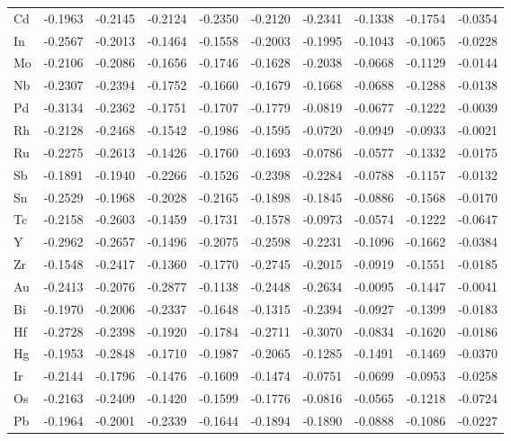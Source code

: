 \begin{table}[htbp]
{\begin{tabular}{l *{9}{l}}
        Cd & -0.1963 & -0.2145 & -0.2124 & -0.2350 & -0.2120 & -0.2341 & -0.1338 & -0.1754 & -0.0354 \\
        In & -0.2567 & -0.2013 & -0.1464 & -0.1558 & -0.2003 & -0.1995 & -0.1043 & -0.1065 & -0.0228 \\
        Mo & -0.2106 & -0.2086 & -0.1656 & -0.1746 & -0.1628 & -0.2038 & -0.0668 & -0.1129 & -0.0144 \\
        Nb & -0.2307 & -0.2394 & -0.1752 & -0.1660 & -0.1679 & -0.1668 & -0.0688 & -0.1288 & -0.0138 \\
        Pd & -0.3134 & -0.2362 & -0.1751 & -0.1707 & -0.1779 & -0.0819 & -0.0677 & -0.1222 & -0.0039 \\
        Rh & -0.2128 & -0.2468 & -0.1542 & -0.1986 & -0.1595 & -0.0720 & -0.0949 & -0.0933 & -0.0021 \\
        Ru & -0.2275 & -0.2613 & -0.1426 & -0.1760 & -0.1693 & -0.0786 & -0.0577 & -0.1332 & -0.0175 \\
        Sb & -0.1891 & -0.1940 & -0.2266 & -0.1526 & -0.2398 & -0.2284 & -0.0788 & -0.1157 & -0.0132 \\
        Sn & -0.2529 & -0.1968 & -0.2028 & -0.2165 & -0.1898 & -0.1845 & -0.0886 & -0.1568 & -0.0170 \\
        Tc & -0.2158 & -0.2603 & -0.1459 & -0.1731 & -0.1578 & -0.0973 & -0.0574 & -0.1222 & -0.0647 \\
        Y  & -0.2962 & -0.2657 & -0.1496 & -0.2075 & -0.2598 & -0.2231 & -0.1096 & -0.1662 & -0.0384 \\
        Zr & -0.1548 & -0.2417 & -0.1360 & -0.1770 & -0.2745 & -0.2015 & -0.0919 & -0.1551 & -0.0185 \\
        Au & -0.2413 & -0.2076 & -0.2877 & -0.1138 & -0.2448 & -0.2634 & -0.0095 & -0.1447 & -0.0041 \\
        Bi & -0.1970 & -0.2006 & -0.2337 & -0.1648 & -0.1315 & -0.2394 & -0.0927 & -0.1399 & -0.0183 \\
        Hf & -0.2728 & -0.2398 & -0.1920 & -0.1784 & -0.2711 & -0.3070 & -0.0834 & -0.1620 & -0.0186 \\
        Hg & -0.1953 & -0.2848 & -0.1710 & -0.1987 & -0.2065 & -0.1285 & -0.1491 & -0.1469 & -0.0370 \\
        Ir & -0.2144 & -0.1796 & -0.1476 & -0.1609 & -0.1474 & -0.0751 & -0.0699 & -0.0953 & -0.0258 \\
        Os & -0.2163 & -0.2409 & -0.1420 & -0.1599 & -0.1776 & -0.0816 & -0.0565 & -0.1218 & -0.0724 \\
        Pb & -0.1964 & -0.2001 & -0.2339 & -0.1644 & -0.1894 & -0.1890 & -0.0888 & -0.1086 & -0.0227 \\

\end{tabular}}
\end{table}

